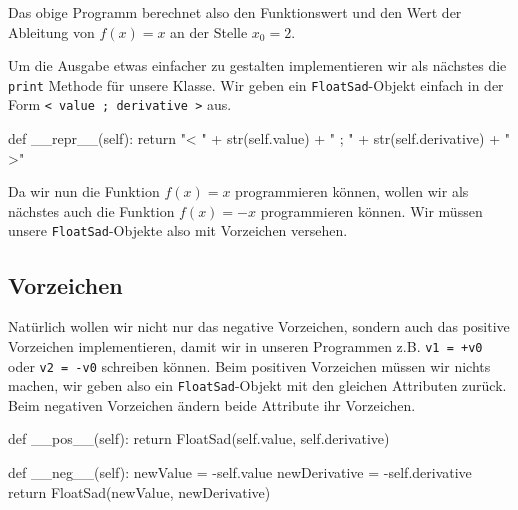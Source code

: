 \documentclass[
  a4paper,
  DIV=11]{scrreprt}
\newenvironment{Shaded}{\begin{snugshade}}{\end{snugshade}}
\newcommand{\BuiltInTok}[1]{\textcolor[rgb]{0.00,0.23,0.31}{#1}}
\newcommand{\ControlFlowTok}[1]{\textcolor[rgb]{0.00,0.23,0.31}{#1}}
\newcommand{\FunctionTok}[1]{\textcolor[rgb]{0.28,0.35,0.67}{#1}}
\newcommand{\KeywordTok}[1]{\textcolor[rgb]{0.00,0.23,0.31}{#1}}
\newcommand{\NormalTok}[1]{\textcolor[rgb]{0.00,0.23,0.31}{#1}}
\newcommand{\OperatorTok}[1]{\textcolor[rgb]{0.37,0.37,0.37}{#1}}
\newcommand{\StringTok}[1]{\textcolor[rgb]{0.13,0.47,0.30}{#1}}
\newcommand{\VariableTok}[1]{\textcolor[rgb]{0.07,0.07,0.07}{#1}}
\theoremstyle{definition}
\theoremstyle{definition}
\theoremstyle{remark}
\begin{document}
Das obige Programm berechnet also den Funktionswert und den Wert der
Ableitung von \(f(x) = x\) an der Stelle \(x_0 = 2\).

Um die Ausgabe etwas einfacher zu gestalten implementieren wir als
nächstes die \texttt{print} Methode für unsere Klasse. Wir geben ein
\texttt{FloatSad}-Objekt einfach in der Form
\texttt{\textless{}\ value\ ;\ derivative\ \textgreater{}} aus.

\begin{Shaded}
\begin{Highlighting}[]
\KeywordTok{def} \FunctionTok{\_\_repr\_\_}\NormalTok{(}\VariableTok{self}\NormalTok{):}
        \ControlFlowTok{return} \StringTok{"\textless{} "} \OperatorTok{+} \BuiltInTok{str}\NormalTok{(}\VariableTok{self}\NormalTok{.value) }\OperatorTok{+} \StringTok{" ; "} \OperatorTok{+} \BuiltInTok{str}\NormalTok{(}\VariableTok{self}\NormalTok{.derivative) }\OperatorTok{+} \StringTok{" \textgreater{}"}
\end{Highlighting}
\end{Shaded}

Da wir nun die Funktion \(f(x) = x\) programmieren können, wollen wir
als nächstes auch die Funktion \(f(x) = -x\) programmieren können. Wir
müssen unsere \texttt{FloatSad}-Objekte also mit Vorzeichen versehen.

\hypertarget{vorzeichen}{%
\subsection{Vorzeichen}\label{vorzeichen}}

Natürlich wollen wir nicht nur das negative Vorzeichen, sondern auch das
positive Vorzeichen implementieren, damit wir in unseren Programmen z.B.
\texttt{v1\ =\ +v0} oder \texttt{v2\ =\ -v0} schreiben können. Beim
positiven Vorzeichen müssen wir nichts machen, wir geben also ein
\texttt{FloatSad}-Objekt mit den gleichen Attributen zurück. Beim
negativen Vorzeichen ändern beide Attribute ihr Vorzeichen.

\begin{Shaded}
\begin{Highlighting}[]
\KeywordTok{def} \FunctionTok{\_\_pos\_\_}\NormalTok{(}\VariableTok{self}\NormalTok{):}
        \ControlFlowTok{return}\NormalTok{ FloatSad(}\VariableTok{self}\NormalTok{.value, }\VariableTok{self}\NormalTok{.derivative)}
    
\KeywordTok{def} \FunctionTok{\_\_neg\_\_}\NormalTok{(}\VariableTok{self}\NormalTok{):}
\NormalTok{    newValue }\OperatorTok{=} \OperatorTok{{-}}\VariableTok{self}\NormalTok{.value}
\NormalTok{    newDerivative }\OperatorTok{=} \OperatorTok{{-}}\VariableTok{self}\NormalTok{.derivative}
    \ControlFlowTok{return}\NormalTok{ FloatSad(newValue, newDerivative)}
\end{Highlighting}
\end{Shaded}
\end{document}
